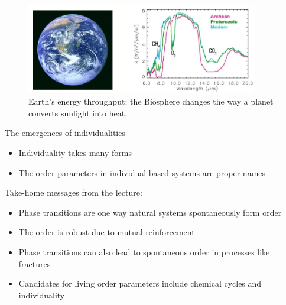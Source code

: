 \documentclass[]{article}
\begin{document}
\begin{figure}[H]
	\caption[Earth’s energy throughput]{Earth’s energy throughput: the Biosphere changes the way a planet converts sunlight into heat.\cite{meadows2005modelling}}\label{fig:EnergyThroughput} 
	\includegraphics[width=0.9\textwidth]{EnergyThroughput}
\end{figure}

The emergences of individualities
\begin{itemize}
	\item Individuality takes many 	forms
	\item The order parameters in individual-based systems 	are proper names
\end{itemize}

Take-home messages from the lecture:
\begin{itemize}
	\item Phase transitions are one way natural systems  spontaneously form order
	\item The order is robust due to mutual reinforcement
	\item Phase transitions can also lead to spontaneous order in processes like fractures
	\item Candidates for living order parameters include chemical cycles and individuality
\end{itemize}





\printglossaries

 


\end{document}
